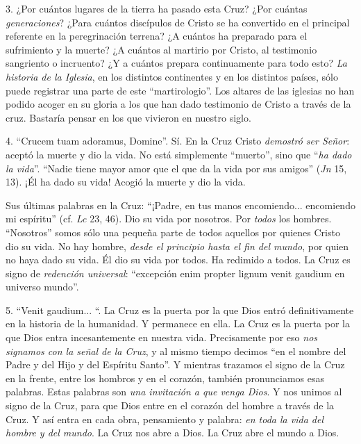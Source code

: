 			\begin{body}3. ¿Por cuántos lugares de la tierra ha pasado esta Cruz? ¿Por cuántas \textit{generaciones}? ¿Para cuántos discípulos de Cristo se ha convertido en el principal referente en la peregrinación terrena? ¿A cuántos ha preparado para el sufrimiento y la muerte? ¿A cuántos al martirio por Cristo, al testimonio sangriento o incruento? ¿Y a cuántos prepara continuamente para todo esto? \textit{La historia de la Iglesia}, en los distintos continentes y en los distintos países, sólo puede registrar una parte de este “martirologio”. Los altares de las iglesias no han podido acoger en su gloria a los que han dado testimonio de Cristo a través de la cruz. Bastaría pensar en los que vivieron en nuestro siglo. \end{body}
			
			\begin{body}4. “Crucem tuam adoramus, Domine”. Sí. En la Cruz Cristo \textit{demostró ser Señor}: aceptó la muerte y dio la vida. No está simplemente “muerto”, sino que “\textit{ha dado la vida}”. “Nadie tiene mayor amor que el que da la vida por sus amigos” (\textit{Jn} 15, 13). ¡Él ha dado su vida! Acogió la muerte y dio la vida. \end{body}
			
			\begin{body}Sus últimas palabras en la Cruz: “¡Padre, en tus manos encomiendo... encomiendo mi espíritu” (cf. \textit{Lc} 23, 46). Dio su vida por nosotros. Por \textit{todos }los hombres. “Nosotros” somos sólo una pequeña parte de todos aquellos por quienes Cristo dio su vida. No hay hombre, \textit{desde el principio hasta el fin del mundo}, por quien no haya dado su vida. Él dio su vida por todos. Ha redimido a todos. La Cruz es signo de \textit{redención universal}: “excepción enim propter lignum venit gaudium en universo mundo”. \end{body}
			
			\begin{body}5. “Venit gaudium... “. La Cruz es la puerta por la que Dios entró definitivamente en la historia de la humanidad. Y permanece en ella. La Cruz es la puerta por la que Dios entra incesantemente en nuestra vida. Precisamente por eso \textit{nos signamos con la señal de la Cruz}, y al mismo tiempo decimos “en el nombre del Padre y del Hijo y del Espíritu Santo”. Y mientras trazamos el signo de la Cruz en la frente, entre los hombros y en el corazón, también pronunciamos esas palabras. Estas palabras son \textit{una invitación a que venga Dios}. Y nos unimos al signo de la Cruz, para que Dios entre en el corazón del hombre a través de la Cruz. Y así entra en cada obra, pensamiento y palabra: \textit{en toda la vida del hombre y del mundo}. La Cruz nos abre a Dios. La Cruz abre el mundo a Dios. \end{body}
			
